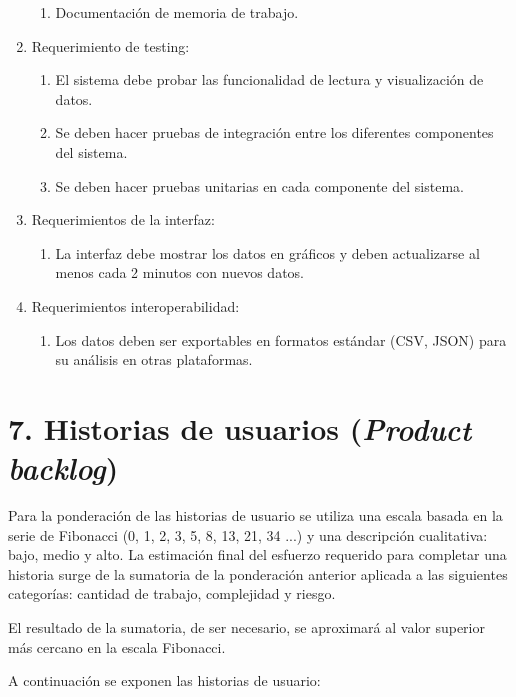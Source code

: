 \documentclass[
11pt, %
codirector, %
]{charter}
\begin{document}
\begin{enumerate}
\begin{enumerate}
			\item Documentación de memoria de trabajo.
		\end{enumerate}
	\item Requerimiento de testing:
		\begin{enumerate}
			\item El sistema debe probar las funcionalidad de lectura y visualización de datos.
			\item Se deben hacer pruebas de integración entre los diferentes componentes del sistema. 
			\item Se deben hacer pruebas unitarias en cada componente del sistema.
		\end{enumerate}
	\item Requerimientos de la interfaz:
		\begin{enumerate}
			\item La interfaz debe mostrar los datos en gráficos y deben actualizarse al menos cada 2 minutos con nuevos datos.
		\end{enumerate}
	\item Requerimientos interoperabilidad:
		\begin{enumerate}
			\item Los datos deben ser exportables en formatos estándar (CSV, JSON) para su análisis en otras plataformas.
		\end{enumerate}
\end{enumerate}

\section{7. Historias de usuarios (\textit{Product backlog})}
\label{sec:backlog}

Para la ponderación de las historias de usuario se utiliza una escala basada en la serie de
Fibonacci (0, 1, 2, 3, 5, 8, 13, 21, 34 ...) y una descripción cualitativa: bajo, medio y alto.
La estimación final del esfuerzo requerido para completar una historia surge de la sumatoria de
la ponderación anterior aplicada a las siguientes categorías: cantidad de trabajo, complejidad
y riesgo. 

El resultado de la sumatoria, de ser necesario, se aproximará al valor superior más
cercano en la escala Fibonacci.

A continuación se exponen las historias de usuario:
\end{document}

